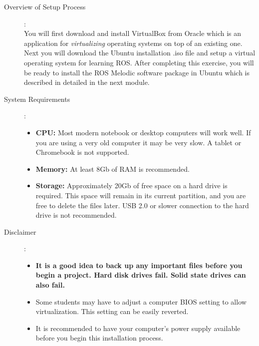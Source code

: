 \documentclass[12pt]{article}
\newcommand{\R}{\color{red}}
\begin{document}
\begin{description}
	\item[Overview of Setup Process]: \vspace{0mm} \\

		        You will first download and install VirtualBox from Oracle which is an application for {\it virtualizing} operating systems on top of an existing one. Next you will download the Ubuntu installation .iso file and setup a virtual operating system for learning ROS.  After completing this exercise, you will be ready to install the ROS Melodic software package in Ubuntu which is described in detailed in the next module. 

	\item[System Requirements]: \vspace{0mm} \\

		        \begin{itemize}

					\item {\bf CPU:} Most modern notebook or desktop computers will work well. If you are using a very old computer it may be very slow. A tablet or Chromebook is not supported.
					\item {\bf Memory:} At least 8Gb of RAM is recommended.        
               
                    \item {\bf Storage:} Approximately 20Gb of free space on a hard drive is required. This space will remain in its current partition, and you are free to delete the files later. USB 2.0 or slower connection to the hard drive is not recommended. 
    
                \end{itemize}
			\item[Disclaimer]: \begin{itemize}
			\item {\bf \R It is a good idea to back up any important files before you begin a project. Hard disk drives fail. Solid state drives can also fail. } 
			\item Some students may have to adjust a computer BIOS setting to allow virtualization. This setting can be easily reverted.   
			\item It is recommended to have your computer's power supply available before you begin this installation process. 
			\end{itemize} 			
			
			
                    

\end{description}
\end{document}
